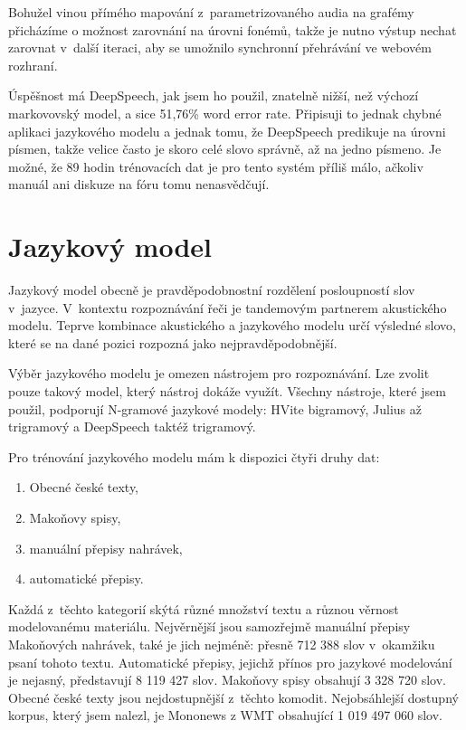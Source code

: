 Bohužel vinou přímého mapování z~parametrizovaného audia na grafémy přicházíme o
možnost zarovnání na úrovni fonémů, takže je nutno výstup nechat zarovnat
v~další iteraci, aby se umožnilo synchronní přehrávání ve webovém rozhraní.

Úspěšnost má DeepSpeech, jak jsem ho použil, znatelně nižší, než výchozí
markovovský model, a sice 51,76\% word error rate. Připisuji to jednak chybné aplikaci jazykového modelu a
jednak tomu, že DeepSpeech predikuje na úrovni písmen, takže velice často je
skoro celé slovo správně, až na jedno písmeno. Je možné, že 89 hodin trénovacích
dat je pro tento systém příliš málo, ačkoliv manuál ani diskuze na fóru tomu
nenasvědčují.

\section{Jazykový model}
\label{sec:jazykovy-model}

Jazykový model obecně je pravděpodobnostní rozdělení posloupností slov
v~jazyce.\cite{ponte1998language} V~kontextu rozpoznávání řeči je tandemovým
partnerem akustického modelu.\cite{jelinek1990self} Teprve kombinace akustického
a jazykového modelu určí výsledné slovo, které se na dané pozici rozpozná jako
nejpravděpodobnější.

Výběr jazykového modelu je omezen nástrojem pro rozpoznávání. Lze zvolit pouze
takový model, který nástroj dokáže využít. Všechny nástroje, které jsem použil,
podporují N-gramové jazykové modely: HVite bigramový, Julius až trigramový a
DeepSpeech taktéž trigramový.

Pro trénování jazykového modelu mám k dispozici čtyři druhy dat:
\begin{enumerate}
\item{Obecné české texty,}
\item{Makoňovy spisy,}
\item{manuální přepisy nahrávek,}
\item{automatické přepisy.}
\end{enumerate}

Každá z~těchto kategorií skýtá různé množství textu a různou věrnost
modelovanému materiálu. Nejvěrnější jsou samozřejmě manuální přepisy Makoňových
nahrávek, také je jich nejméně: přesně 712 388 slov v~okamžiku psaní tohoto
textu. Automatické přepisy, jejichž přínos pro jazykové modelování je nejasný,
představují 8 119 427 slov. Makoňovy spisy obsahují 3 328 720 slov. Obecné české
texty jsou nejdostupnější z~těchto komodit. Nejobsáhlejší dostupný korpus, který
jsem nalezl, je Mononews z WMT obsahující 1 019 497 060 slov.

